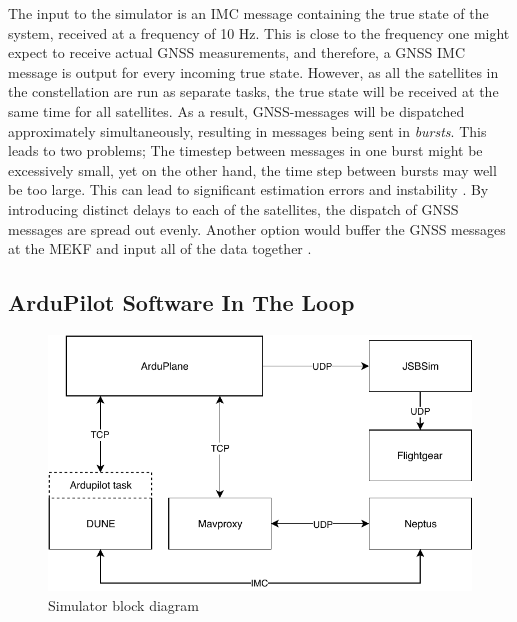     The input to the simulator is an IMC message containing the true state of the system, received at a frequency of 10 Hz. This is close to the frequency one might expect to receive actual GNSS measurements, and therefore, a GNSS IMC message is output for every incoming true state. However, as all the satellites in the constellation are run as separate tasks, the true state will be received at the same time for all satellites. As a result, GNSS-messages will be dispatched approximately simultaneously, resulting in messages being sent in \textit{bursts}. This leads to two problems; The timestep between messages in one burst might be excessively small, yet on the other hand, the time step between bursts may well be too large. This can lead to significant estimation errors and instability . By introducing distinct delays to each of the satellites, the dispatch of GNSS messages are spread out evenly. Another option would buffer the GNSS messages at the MEKF and input all of the data together .

\subsection{ArduPilot Software In The Loop}
\begin{figure}
    \centering
    \includegraphics{Images/Simulator.pdf}
    \caption{Simulator block diagram}
    \label{fig:sim-diag}
\end{figure}
%
%

